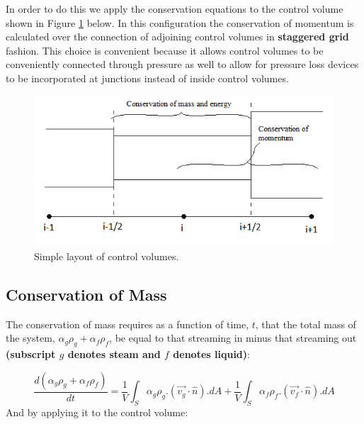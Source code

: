 \documentclass[11pt,letterpaper,titlepage]{article}
\begin{document}
\vspace{0.25cm}
\noindent
In order to do this we apply the conservation equations to the control volume shown in Figure \ref{figure:ZZZ_ControlVolume} below. In this configuration the conservation of momentum is calculated over the connection of adjoining control volumes in \textbf{staggered grid} fashion. This choice is convenient because it allows control volumes to be conveniently connected through pressure as well to allow for pressure loss devices to be incorporated at junctions instead of inside control volumes.
	\begin{center}
		\begin{minipage}[c]{0.85\textwidth}
	
			\begin{figure}[H]
			
				\includegraphics{ZZZ_ControlVolume.png}
				\caption{Simple layout of control volumes.}
				\label{figure:ZZZ_ControlVolume}
			\end{figure}
		\end{minipage}
	\end{center}
\vspace{0.5cm}

\newpage
\subsection{Conservation of Mass}
The conservation of mass requires as a function of time, $t$, that the total mass of the system, $\alpha_g \rho_g+\alpha_f\rho_f$, be equal to that streaming in minus that streaming out \textbf{(subscript $g$ denotes steam and $f$ denotes liquid)}:

\begin{equation*}
\frac{d(\alpha_g \rho_g+\alpha_f\rho_f)}{dt}=\frac{1}{V}\int_S \alpha_g\rho_g.(\vec{v_g}\cdot \hat{n}).dA+\frac{1}{V}\int_S \alpha_f\rho_f.(\vec{v_f}\cdot \hat{n}).dA
\end{equation*}
\newline
\noindent And by applying it to the control volume:
\end{document}
